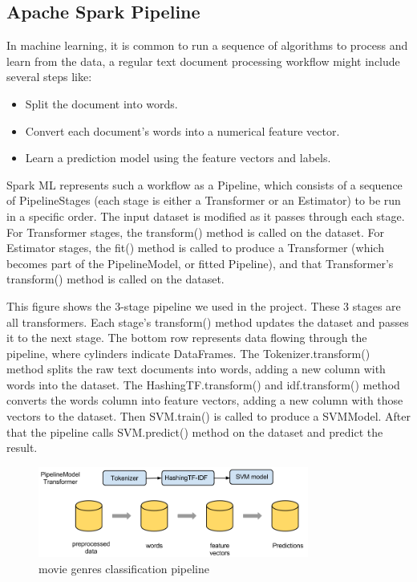 \documentclass{vldb}
\begin{document}
\subsection{Apache Spark Pipeline}
In machine learning, it is common to run a sequence of algorithms to process and learn from the data, a regular text document processing workflow might include several steps like:
\begin{itemize}
\item {Split the document into words.}
\item {Convert each document's words into a numerical feature vector.}
\item {Learn a prediction model using the feature vectors and labels.}
\end{itemize}
\par Spark ML represents such a workflow as a Pipeline, which consists of a sequence of PipelineStages (each stage is either a Transformer or an Estimator) to be run in a specific order. The input dataset is modified as it passes through each stage. For Transformer stages, the transform() method is called on the dataset. For Estimator stages, the fit() method is called to produce a Transformer (which becomes part of the PipelineModel, or fitted Pipeline), and that Transformer’s transform() method is called on the dataset.
\par This figure shows the 3-stage pipeline we used in the project. These 3 stages are all transformers.  Each stage’s transform() method updates the dataset and passes it to the next stage. The bottom row represents data flowing through the pipeline, where cylinders indicate DataFrames. The Tokenizer.transform() method splits the raw text documents into words, adding a new column with words into the dataset. The HashingTF.transform() and idf.transform() method converts the words column into feature vectors, adding a new column with those vectors to the dataset. Then SVM.train() is called to produce a SVMModel. After that the pipeline calls SVM.predict() method on the dataset and predict the result.
\begin{figure}
\begin{center}
\includegraphics[width=3.50in]{AIM3-pipeline.png}
\caption{movie genres classification pipeline}
\end{center}
\end{figure}
\end{document}
